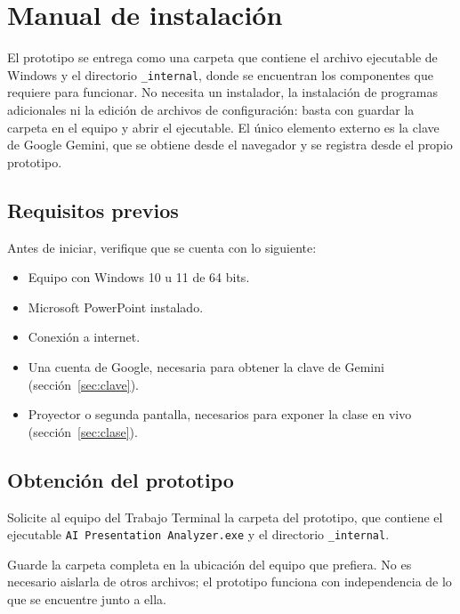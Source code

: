\documentclass[11pt,letterpaper]{article}
\newcommand{\ruta}[1]{\texttt{#1}}
\newcommand{\nombreexe}{\ruta{AI Presentation Analyzer.exe}}
\newcommand{\carpetainterna}{\ruta{\_internal}}
\begin{document}
\section{Manual de instalación}
\label{sec:instalacion}

El prototipo se entrega como una carpeta que contiene el archivo ejecutable de Windows y el directorio \carpetainterna, donde se encuentran los componentes que requiere para funcionar. No necesita un instalador, la instalación de programas adicionales ni la edición de archivos de configuración: basta con guardar la carpeta en el equipo y abrir el ejecutable. El único elemento externo es la clave de Google Gemini, que se obtiene desde el navegador y se registra desde el propio prototipo.

\subsection{Requisitos previos}
\label{sec:previos}

Antes de iniciar, verifique que se cuenta con lo siguiente:

\begin{itemize}
  \item Equipo con Windows 10 u 11 de 64 bits.
  \item Microsoft PowerPoint instalado.
  \item Conexión a internet.
  \item Una cuenta de Google, necesaria para obtener la clave de Gemini (sección~\ref{sec:clave}).
  \item Proyector o segunda pantalla, necesarios para exponer la clase en vivo (sección~\ref{sec:clase}).
\end{itemize}

\subsection{Obtención del prototipo}
\label{sec:obtener}

\begin{pasos}
  \item Solicite al equipo del Trabajo Terminal la carpeta del prototipo, que contiene el ejecutable \nombreexe{} y el directorio \carpetainterna.
  \item Guarde la carpeta completa en la ubicación del equipo que prefiera. No es necesario aislarla de otros archivos; el prototipo funciona con independencia de lo que se encuentre junto a ella.
\end{pasos}
\end{document}
